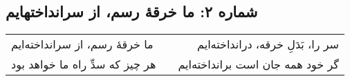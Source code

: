 \begin{center}
\section*{شماره ۲: ما خرقۀ رسم، از سرانداختهایم}
\label{sec:002}
\begin{longtable}{l p{0.5cm} r}
ما خرقهٔ رسم، از سرانداخته‌ایم
&&
سر را، بَدَلِ خرقه، درانداخته‌ایم
\\
هر چیز که سدِّ راه ما خواهد بود
&&
گر خود همه جان است برانداخته‌ایم
\\
\end{longtable}
\end{center}
